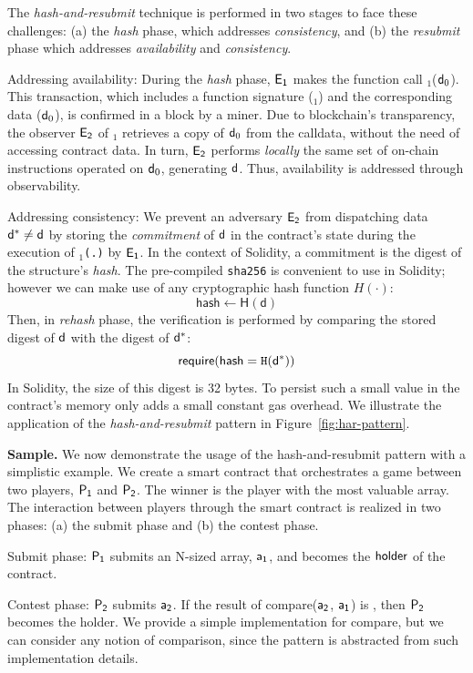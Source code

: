 \noindent
The \emph{hash-and-resubmit} technique is performed in two
stages to face these challenges: (a) the \emph{hash} phase, which addresses
\emph{consistency}, and (b) the \emph{resubmit} phase which addresses
\emph{availability} and \emph{consistency}.

\noindent \textsf{Addressing availability:} During the \emph{hash} phase,
$\mathsf{E_{1}}$ makes the function call \texttt{\proc}$_1$($\mathsf{d}_0$). This
transaction, which includes a function signature (\texttt{\proc$_1$}) and the
corresponding data ($\mathsf{d}_0$), is confirmed in a block by a miner. Due to
blockchain's transparency, the observer $\mathsf{E_{2}}$ of \texttt{\proc}$_1$
retrieves a copy of $\mathsf{d}_0$ from the calldata, without the need of accessing contract data. In
turn, $\mathsf{E_{2}}$ performs \emph{locally} the same set of on-chain instructions
operated on $\mathsf{d}_0$, generating $\mathsf{d}$. Thus, availability is addressed
through observability.

\noindent \textsf{Addressing consistency:} We prevent an adversary $\mathsf{E_{2}}$
from dispatching data $\mathsf{d^*}\neq\mathsf{d}$ by storing the \emph{commitment} of
$\mathsf{d}$ in the contract's state during the execution of \texttt{\proc$_1$(.)} by
$\mathsf{E_{1}}$. In the context of Solidity, a commitment is the
digest of the structure's \emph{hash}. The pre-compiled \texttt{sha256} is
convenient to use in Solidity; however we can make use of any cryptographic
hash function $H(\cdot)$: \[\textsf{hash} \gets \textsf{H}(\textsf{d})\]
Then, in \emph{rehash} phase, the verification is performed by comparing the
stored digest of $\mathsf{d}$ with the digest of $\mathsf{d^*}$:
\[\textsf{require}(\textsf{hash} = \texttt{H}(\mathsf{d^*}))\] \noindent In Solidity,
the size of this digest is 32 bytes. To persist such a small value in the
contract's memory only adds a small constant gas overhead. We illustrate
the application of the \emph{hash-and-resubmit} pattern in
Figure~\ref{fig:har-pattern}.

\noindent \textbf{Sample.} We now demonstrate the usage of the
hash-and-resubmit pattern with a simplistic example. We create a smart contract
that orchestrates a game between two players, $\mathsf{P_1}$ and $\mathsf{P_2}$. The winner is
the player with the most valuable array. The interaction between players
through the smart contract is realized in two phases: (a) the submit phase and
(b) the contest phase.

\noindent \textsf{Submit phase:} $\mathsf{P_1}$ submits an N-sized array, $\mathsf{a_1}$, and
becomes the $\mathsf{holder}$ of the contract.

\noindent \textsf{Contest phase:} $\mathsf{P_2}$ submits $\mathsf{a_2}$. If the result of
\textsf{compare}($\mathsf{a_2}$, $\mathsf{a_1}$) is \true, then $\mathsf{P_2}$ becomes the holder. We
provide a simple implementation for \textsf{compare}, but we can consider any
notion of comparison, since the pattern is abstracted from such implementation
details.

